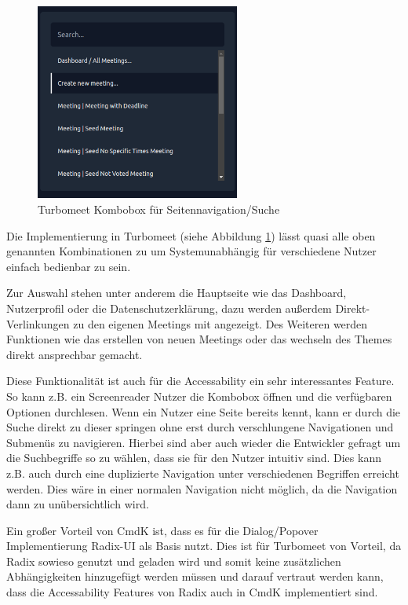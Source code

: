 \begin{figure}[th]
    \centering
    \includegraphics[width=0.6\textwidth]{Figures/turbomeet_cmdk.png}
    \decoRule
    \caption[Turbomeet Kombobox]{Turbomeet Kombobox für Seitennavigation/Suche}
    \label{fig:turbomeet_cmdk}
\end{figure}

Die Implementierung in Turbomeet (siehe Abbildung \ref{fig:turbomeet_cmdk}) lässt quasi alle oben genannten Kombinationen zu um Systemunabhängig für verschiedene Nutzer einfach bedienbar zu sein.

Zur Auswahl stehen unter anderem die Hauptseite wie das Dashboard, Nutzerprofil oder die Datenschutzerklärung, dazu werden außerdem Direkt-Verlinkungen zu den eigenen Meetings mit angezeigt. Des Weiteren werden Funktionen wie das erstellen von neuen Meetings oder das wechseln des Themes direkt ansprechbar gemacht.

Diese Funktionalität ist auch für die Accessability ein sehr interessantes Feature. So kann z.B. ein Screenreader Nutzer die Kombobox öffnen und die verfügbaren Optionen durchlesen. Wenn ein Nutzer eine Seite bereits kennt, kann er durch die Suche direkt zu dieser springen ohne erst durch verschlungene Navigationen und Submenüs zu navigieren. Hierbei sind aber auch wieder die Entwickler gefragt um die Suchbegriffe so zu wählen, dass sie für den Nutzer intuitiv sind. Dies kann z.B. auch durch eine duplizierte Navigation unter verschiedenen Begriffen erreicht werden. Dies wäre in einer normalen Navigation nicht möglich, da die Navigation dann zu unübersichtlich wird.

Ein großer Vorteil von CmdK ist, dass es für die Dialog/Popover Implementierung Radix-UI als Basis nutzt. Dies ist für Turbomeet von Vorteil, da Radix sowieso genutzt und geladen wird und somit keine zusätzlichen Abhängigkeiten hinzugefügt werden müssen und darauf vertraut werden kann, dass die Accessability Features von Radix auch in CmdK implementiert sind.

